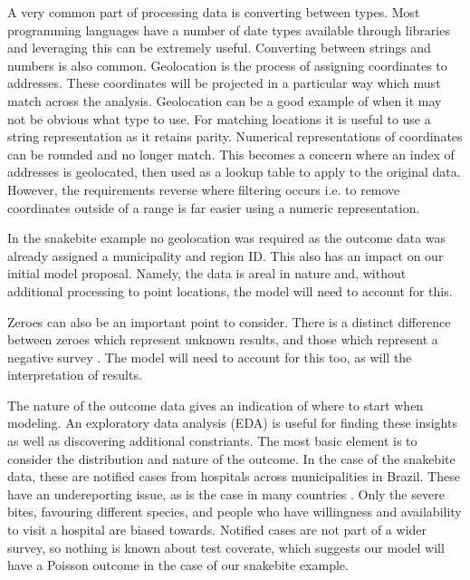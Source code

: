 \documentclass{article}
\begin{document}
A very common part of processing data is converting between types. Most programming languages have a number of date types available through libraries and leveraging this can be extremely useful. Converting between strings and numbers is also common.
Geolocation is the process of assigning coordinates to addresses. These coordinates will be projected in a particular way which must match across the analysis. Geolocation can be a good example of when it may not be obvious what type to use. For matching locations it is useful to use a string representation as it retains parity. Numerical representations of coordinates can be rounded and no longer match. This becomes a concern where an index of addresses is geolocated, then used as a lookup table to apply to the original data. However, the requirements reverse where filtering occurs i.e. to remove coordinates outside of a range is far easier using a numeric representation.

In the snakebite example no geolocation was required as the outcome data was already assigned a municipality and region ID. This also has an impact on our initial model proposal. Namely, the data is areal in nature and, without additional processing to point locations, the model will need to account for this.

Zeroes can also be an important point to consider. There is a distinct difference between zeroes which represent unknown results, and those which represent a negative survey \cite{andersonBlackSwansSpace2019}. The model will need to account for this too, as will the interpretation of results.

The nature of the outcome data gives an indication of where to start when modeling. An exploratory data analysis (EDA) is useful for finding these insights as well as discovering additional constriants. The most basic element is to consider the distribution and nature of the outcome. In the case of the snakebite data, these are notified cases from hospitals across municipalities in Brazil. These have an undereporting issue, as is the case in many countries \cite{chavesSnakebitesAreAssociated2015} \cite{ediriweeraHealthSeekingBehavior2017}. Only the severe bites, favouring different species, and people who have willingness and availability to visit a hospital are biased towards. Notified cases are not part of a wider survey, so nothing is known about test coverate, which suggests our model will have a Poisson outcome in the case of our snakebite example.
\end{document}
